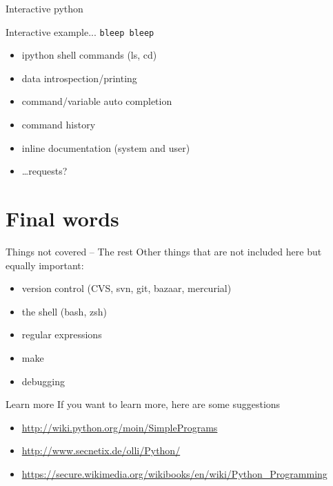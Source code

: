\documentclass[xetex,10pt]{beamer}
\def\spacer{\vspace*{1em}}
\begin{document}
\begin{frame}[fragile]{Interactive python}

Interactive example... \pause \texttt{bleep bleep}

\spacer
\pause

\begin{itemize}
	\item ipython shell commands (ls, cd)
	\item data introspection/printing
	\item command/variable auto completion
	\item command history
	\item inline documentation (system and user)
	\item \ldots requests?
\end{itemize}

\end{frame}

\section{Final words}

\begin{frame}[fragile]{Things not covered -- The rest}
	Other things that are not included here but equally important:
	\spacer
	\begin{itemize}
		\item version control (CVS, svn, git, bazaar, mercurial)
		\item the shell (bash, zsh)
		\item regular expressions
		\item make
		\item debugging
	\end{itemize}
\end{frame}

\begin{frame}[fragile]{Learn more}
	If you want to learn more, here are some suggestions
	\spacer
	\begin{itemize}
		\item \url{http://wiki.python.org/moin/SimplePrograms}
		\item \url{http://www.secnetix.de/olli/Python/}
		\item \url{https://secure.wikimedia.org/wikibooks/en/wiki/Python_Programming}
	\end{itemize}
	
\end{frame}
\end{document}
